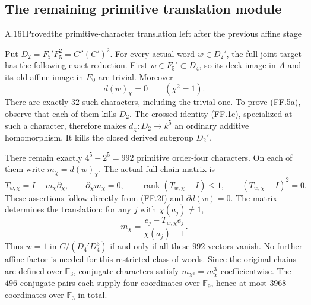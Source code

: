\subsection{The remaining primitive translation module}


\begin{statement}{A.161}{Proved}{the primitive-character translation left after the previous affine stage}
\end{statement}
Put $D_2=F_5'F_5^2=C''(C')^2$. For every actual word
$w\in D_2'$, the full joint target has the following exact
reduction. First $w\in F_5'\subset D_4$, so its deck image
in $A$ and its old affine image in $E_0$ are trivial. Moreover
\[
                    d(w)_\chi=0\qquad(\chi^2=1).
 \tag{FF.5a}
\]
There are exactly $32$ such characters, including the trivial
one. To prove (FF.5a), observe that each of them kills $D_2$.
The crossed identity (FF.1c), specialized at such a character,
therefore makes $d_\chi:D_2\to k^5$ an ordinary additive
homomorphism. It kills the closed derived subgroup $D_2'$.

There remain exactly $4^5-2^5=992$ primitive order-four
characters. On each of them write $m_\chi=d(w)_\chi$. The
actual full-chain matrix is
\[
 T_{w,\chi}=I-m_\chi\partial_\chi,\qquad
 \partial_\chi m_\chi=0,\qquad
 \operatorname{rank}(T_{w,\chi}-I)\leq1,\qquad
 (T_{w,\chi}-I)^2=0.
 \tag{FF.5b}
\]
These assertions follow directly from (FF.2f) and
$\partial d(w)=0$. The matrix determines the translation:
for any $j$ with $\chi(a_j)\ne1$,
\[
             m_\chi=
 \frac{e_j-T_{w,\chi}e_j}{\chi(a_j)-1}.
 \tag{FF.5c}
\]
Thus $w=1$ in $C/(D_4'D_4^3)$ if and only if all these
$992$ vectors vanish. No further affine factor is needed
for this restricted class of words. Since the original
chains are defined over $\mathbb F_3$, conjugate characters
satisfy $m_{\chi^3}=m_\chi^3$ coefficientwise. The $496$
conjugate pairs each supply four coordinates over
$\mathbb F_9$, hence at most $3968$ coordinates over
$\mathbb F_3$ in total.

